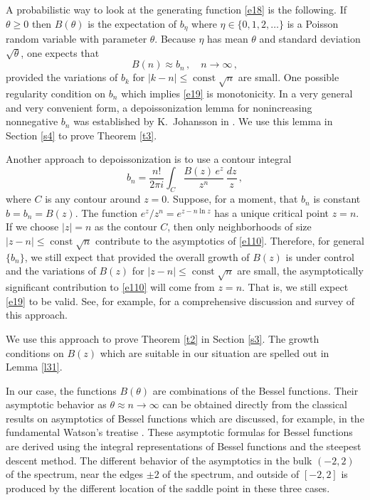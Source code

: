 \documentclass[12pt]{amsart}
\newcommand{\const}{\operatorname{const}}
\newcommand{\ix}{\theta}
\theoremstyle{plain}
\theoremstyle{definition}
\numberwithin{equation}{section}
\begin{document}
A probabilistic way to look at the generating function \eqref{e18} is the
following. If $\theta\ge 0$ then $B(\theta)$ is the expectation
of $b_\eta$ where $\eta\in\{0,1,2,\dots\}$ is a Poisson random
variable with parameter $\theta$. Because $\eta$ has mean $\theta$
and standard deviation $\sqrt\theta$, one expects that 
%
\begin{equation}\label{e19}
B(n) \approx b_n\,, \quad n\to\infty \,,
\end{equation}
%
provided the variations of $b_k$ for $|k-n|\le \const\sqrt n$ are small. 
One possible regularity condition on $b_n$ which implies \eqref{e19} 
is monotonicity. In a very general and very 
convenient form, a depoissonization lemma for nonincreasing
nonnegative $b_n$  was established by K.~Johansson in \cite{J}.
We use this lemma in Section \ref{s4} to prove Theorem \ref{t3}.

Another approach to depoissonization is to use a contour integral
%
\begin{equation}\label{e110}
b_n = \frac{n!}{2\pi i} \int_C \frac{B(z)\, e^{z}}{z^n} \,  \frac{dz}{z} \,,
\end{equation}
%
where $C$ is any contour around $z=0$.  Suppose, for a moment, that
$b_n$ is constant $b=b_n=B(z)$.  
The function $e^z/z^n=e^{z-n\ln z}$ has a unique critical point $z=n$. If
we choose $|z|=n$ as the contour $C$,  then  only neighborhoods of
size $|z-n|\le \const\sqrt{n}$ contribute to the asymptotics of \eqref{e110}.
Therefore, for general $\{b_n\}$, we still expect that provided  
the overall growth of $B(z)$ is under control  and the
variations of $B(z)$ for $|z-n| \le \const\sqrt n$  are small,
the asymptotically significant contribution to \eqref{e110} will come from 
$z=n$. That is,  we still expect \eqref{e19} to be valid. See, for example,
\cite{JS} for a comprehensive discussion and survey of this approach. 

We use this 
approach to prove Theorem \ref{t2} in Section \ref{s3}. The growth
conditions on $B(z)$ which are suitable in our situation are
spelled out in Lemma \ref{l31}. 

In our case, the functions $B(\ix)$ are combinations of the Bessel
functions. Their asymptotic behavior as $\theta\approx n \to\infty$
can be obtained directly from the classical results on asymptotics 
of Bessel functions which are  discussed, for example, in the fundamental
Watson's treatise \cite{W}. 
These asymptotic formulas for Bessel functions are derived using
the integral representations of Bessel functions and the steepest descent
method. The different behavior of the asymptotics in the bulk $(-2,2)$ of the spectrum,
near the edges $\pm 2$ of the spectrum, and outside of $[-2,2]$  is produced
by the different location of the saddle point in these three cases. 
\end{document}
